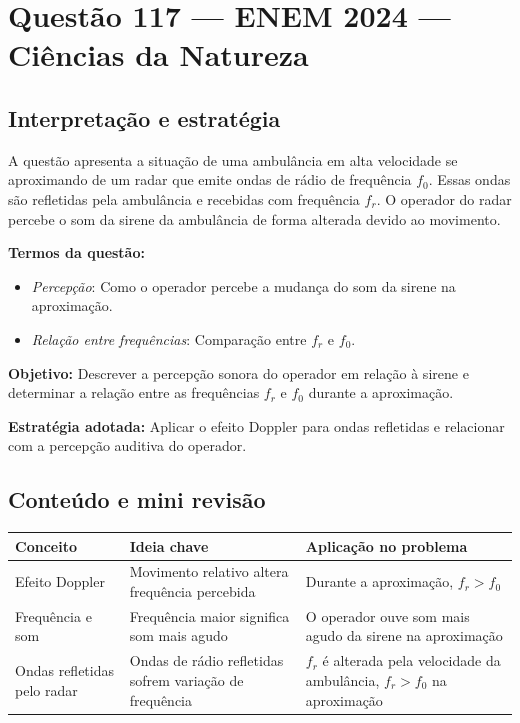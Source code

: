 \documentclass{article}
\begin{document}
\section*{Questão 117 — ENEM 2024 — Ciências da Natureza}

\subsection*{Interpretação e estratégia}

A questão apresenta a situação de uma ambulância em alta velocidade se aproximando de um radar que emite ondas de rádio de frequência \(f_0\). Essas ondas são refletidas pela ambulância e recebidas com frequência \(f_r\). O operador do radar percebe o som da sirene da ambulância de forma alterada devido ao movimento.

\textbf{Termos da questão:}
\begin{itemize}
  \item \textit{Percepção}: Como o operador percebe a mudança do som da sirene na aproximação.
  \item \textit{Relação entre frequências}: Comparação entre \(f_r\) e \(f_0\).
\end{itemize}

\textbf{Objetivo:} Descrever a percepção sonora do operador em relação à sirene e determinar a relação entre as frequências \(f_r\) e \(f_0\) durante a aproximação.

\textbf{Estratégia adotada:} Aplicar o efeito Doppler para ondas refletidas e relacionar com a percepção auditiva do operador.

\subsection*{Conteúdo e mini revisão}

\begin{tabular}{|p{}|p{}|p{}|}
\hline
\textbf{Conceito} & \textbf{Ideia chave} & \textbf{Aplicação no problema} \\
\hline
Efeito Doppler & Movimento relativo altera frequência percebida & Durante a aproximação, \(f_r > f_0\) \\
\hline
Frequência e som & Frequência maior significa som mais agudo & O operador ouve som mais agudo da sirene na aproximação \\
\hline
Ondas refletidas pelo radar & Ondas de rádio refletidas sofrem variação de frequência & \(f_r\) é alterada pela velocidade da ambulância, \(f_r > f_0\) na aproximação \\
\hline
\end{tabular}
\end{document}
